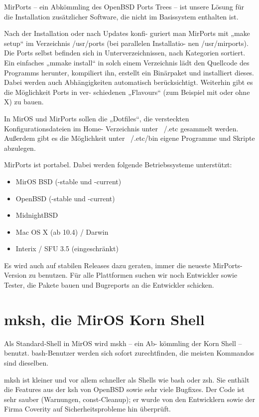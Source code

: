 \documentclass[
a4paper,%
notumble%
]{leaflet}
\begin{document}
MirPorts -- ein Abkömmling des OpenBSD Ports Trees -- ist unsere Lösung für die Installation zusätzlicher Software, die nicht im Basissystem enthalten ist.

Nach der Installation oder nach Updates konfi- guriert man MirPorts mit „make setup“ im Verzeichnis /usr/ports (bei parallelen Installatio- nen /usr/mirports). Die Ports selbst befinden sich in Unterverzeichnissen, nach Kategorien sortiert. Ein einfaches „mmake install“ in solch einem Verzeichnis lädt den Quellcode des Programms herunter, kompiliert ihn, erstellt ein Binärpaket und installiert dieses. Dabei werden auch Abhängigkeiten automatisch berücksichtigt. Weiterhin gibt es die Möglichkeit Ports in ver- schiedenen „Flavours“ (zum Beispiel mit oder ohne X) zu bauen.

In MirOS und MirPorts sollen die „Dotfiles“, die versteckten Konfigurationsdateien im Home- Verzeichnis unter ~/.etc gesammelt werden. Außerdem gibt es die Möglichkeit unter ~/.etc/bin eigene Programme und Skripte abzulegen.

MirPorts ist portabel. Dabei werden folgende Betriebssysteme unterstützt:

\begin{itemize}
\item MirOS BSD (-stable und -current)
\item OpenBSD (-stable und -current)
\item MidnightBSD
\item Mac OS X (ab 10.4) / Darwin
\item Interix / SFU 3.5 (eingeschränkt)
\end{itemize}

Es wird auch auf stabilen Releases dazu geraten, immer die neueste MirPorts-Version zu benutzen. Für alle Plattformen suchen wir noch Entwickler sowie Tester, die Pakete bauen und Bugreports an die Entwickler schicken.

\newpage

\section{mksh, die MirOS Korn Shell}

Als Standard-Shell in MirOS wird mskh – ein Ab- kömmling der Korn Shell – benutzt. bash-Benutzer werden sich sofort zurechtfinden, die meisten Kommandos sind dieselben.

mksh ist kleiner und vor allem schneller als Shells wie bash oder zsh. Sie enthält die Features aus der ksh von OpenBSD sowie sehr viele Bugfixes. Der Code ist sehr sauber (Warnungen, const-Cleanup); er wurde von den Entwicklern sowie der Firma Coverity auf Sicherheitsprobleme hin überprüft.
\end{document}
